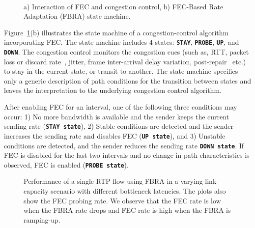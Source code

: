 \begin{figure}
  \centering
   \\
\caption{a) Interaction of FEC and congestion control, b) FEC-Based Rate
Adaptation (FBRA) state machine.}
\label{fig:fecrc-intro}
\end{figure}


Figure~\ref{fig:fecrc-intro}(b) illustrates the state machine of a
congestion-control algorithm incorporating FEC. The state machine includes 4
states: \texttt{\textbf{STAY}}, \texttt{\textbf{PROBE}}, \texttt{\textbf{UP}},
and \texttt{\textbf{DOWN}}. The congestion control monitors the congestion
cues (such as, RTT, packet loss or discard rate~\cite{rfc7002, rfc7097, draft.xr.bytes.discarded}, jitter, frame inter-arrival
delay variation, post-repair~\cite{rfc5725, draft.xr.post.repair} etc.) to stay in the current state, or transit to
another. The state machine specifies only a generic description of path
conditions for the transition between states and leaves the interpretation to
the underlying congestion control algorithm.

After enabling FEC for an interval, one of the following three conditions may
occur: 1) No more bandwidth is available and the sender keeps the current sending
rate (\texttt{\textbf{STAY state}}), 2) Stable conditions are detected and the
sender increases the sending rate and disables FEC (\texttt{\textbf{UP
state}}), and 3) Unstable conditions are detected, and the sender reduces the
sending rate \texttt{\textbf{DOWN state}}. If FEC is disabled for the last two
intervals and no change in path characteristics is observed, FEC is enabled
(\texttt{\textbf{PROBE state}}).


\begin{figure}
\caption{Performance of a single RTP flow using FBRA in a
varying link capacity scenario with different bottleneck latencies. The plots
also show the FEC probing rate. We observe that the FEC rate is low when the
FBRA rate drops and FEC rate is high when the FBRA is ramping-up.}
\label{fig:fecrc-var}
\end{figure}

